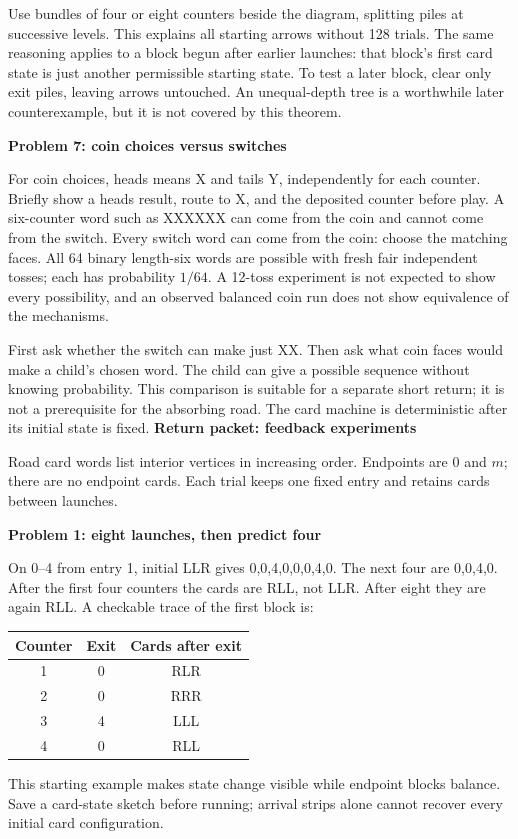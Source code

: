 \documentclass[11pt]{article}
\newcommand{\head}[1]{\vspace{3pt}\textbf{\large #1}\par}
\newcommand{\prob}[1]{\vspace{3pt}\textbf{#1}\par}
\begin{document}
Use bundles of four or eight counters beside the diagram, splitting piles at successive levels. This explains all starting arrows without 128 trials. The same reasoning applies to a block begun after earlier launches: that block's first card state is just another permissible starting state. To test a later block, clear only exit piles, leaving arrows untouched. An unequal-depth tree is a worthwhile later counterexample, but it is not covered by this theorem.

\prob{Problem 7: coin choices versus switches}
For coin choices, heads means X and tails Y, independently for each counter. Briefly show a heads result, route to X, and the deposited counter before play. A six-counter word such as XXXXXX can come from the coin and cannot come from the switch. Every switch word can come from the coin: choose the matching faces. All 64 binary length-six words are possible with fresh fair independent tosses; each has probability $1/64$. A 12-toss experiment is not expected to show every possibility, and an observed balanced coin run does not show equivalence of the mechanisms.

First ask whether the switch can make just XX. Then ask what coin faces would make a child's chosen word. The child can give a possible sequence without knowing probability. This comparison is suitable for a separate short return; it is not a prerequisite for the absorbing road. The card machine is deterministic after its initial state is fixed.
\newpage
\head{Return packet: feedback experiments}
Road card words list interior vertices in increasing order. Endpoints are 0 and $m$; there are no endpoint cards. Each trial keeps one fixed entry and retains cards between launches.

\prob{Problem 1: eight launches, then predict four}
On 0--4 from entry 1, initial LLR gives 0,0,4,0,0,0,4,0. The next four are 0,0,4,0. After the first four counters the cards are RLL, not LLR. After eight they are again RLL. A checkable trace of the first block is:
\begin{center}\begin{tabular}{ccc}\toprule
Counter & Exit & Cards after exit\\\midrule
1&0&RLR\\2&0&RRR\\3&4&LLL\\4&0&RLL\\\bottomrule\end{tabular}\end{center}
This starting example makes state change visible while endpoint blocks balance. Save a card-state sketch before running; arrival strips alone cannot recover every initial card configuration.
\end{document}
